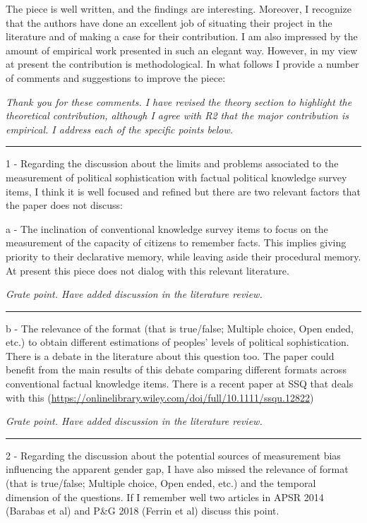 The piece is well written, and the findings are interesting. Moreover, I recognize that the authors have done an excellent job of situating their project in the literature and of making a case for their contribution. I am also impressed by the amount of empirical work presented in such an elegant way. However, in my view at present the contribution is methodological. In what follows I provide a number of comments and suggestions to improve the piece:

\textit{Thank you for these comments. I have revised the theory section to highlight the theoretical contribution, although I agree with R2 that the major contribution is empirical. I address each of the specific points below.}

\rule{\linewidth}{.01cm}

1 - Regarding the discussion about the limits and problems associated to the measurement of political sophistication with factual political knowledge survey items, I think it is well focused and refined but there are two relevant factors that the paper does not discuss: 

a - The inclination of conventional knowledge survey items to focus on the measurement of the capacity of citizens to remember facts. This implies giving priority to their declarative memory, while leaving aside their procedural memory. At present this piece does not dialog with this relevant literature.

\textit{Grate point. Have added discussion in the literature review.}

\rule{\linewidth}{.01cm}

b - The relevance of the format (that is true/false; Multiple choice, Open ended, etc.) to obtain different estimations of peoples' levels of political sophistication. There is a debate in the literature about this question too. The paper could benefit from the main results of this debate comparing different formats across conventional factual knowledge items. There is a recent paper at SSQ that deals with this (\url{https://onlinelibrary.wiley.com/doi/full/10.1111/ssqu.12822})

\textit{Grate point. Have added discussion in the literature review.}

\rule{\linewidth}{.01cm}

2 - Regarding the discussion about the potential sources of measurement bias influencing the apparent gender gap, I have also missed the relevance of format (that is true/false; Multiple choice, Open ended, etc.) and the temporal dimension of the questions. If I remember well two articles in APSR 2014 (Barabas et al) and P\&G 2018 (Ferrin et al) discuss this point.

